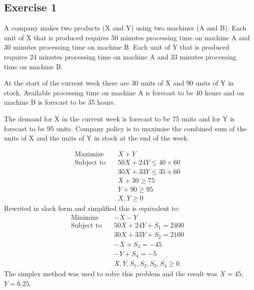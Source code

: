 \subsection{Exercise 1}
A company makes two products (X and Y) using two machines (A and B). Each unit of X that is produced requires 50 minutes processing time on machine A and 30 minutes processing time on machine B. Each unit of Y that is produced requires 24 minutes processing time on machine A and 33 minutes processing time on machine B.

At the start of the current week there are 30 units of X and 90 units of Y in stock. Available processing time on machine A is forecast to be 40 hours and on machine B is forecast to be 35 hours.

The demand for X in the current week is forecast to be 75 units and for Y is forecast to be 95 units. Company policy is to maximise the combined sum of the units of X and the units of Y in stock at the end of the week.

\begin{equation}
    \begin{aligned}
        \text{Maximize} \quad   & X + Y                       \\
        \text{Subject to} \quad & 50X + 24Y \leq 40 \times 60 \\
                                & 30X + 33Y \leq 35 \times 60 \\
                                & X + 30 \ge 75               \\
                                & Y + 90 \ge 95               \\
                                & X, Y \geq 0
    \end{aligned}
\end{equation}
Rewrited in slack form and simplified this is equivalent to:
\begin{equation}
    \begin{aligned}
        \text{Minimize} \quad   & -X - Y                          \\
        \text{Subject to} \quad & 50X + 24Y + S_1 = 2400          \\
                                & 30X + 33Y + S_2 = 2100          \\
                                & -X + S_3 = -45                  \\
                                & -Y + S_4 = -5                   \\
                                & X, Y, S_1, S_2, S_3, S_4 \geq 0
    \end{aligned}
\end{equation}
The simplex method was used to solve this problem and the result was $X = 45$, $Y = 6.25$.

